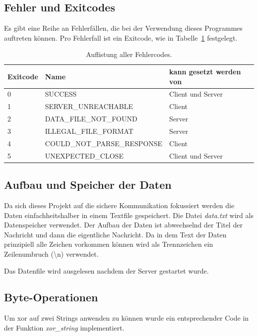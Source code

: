 \documentclass[]{article}
\begin{document}
\subsection{Fehler und Exitcodes}
Es gibt eine Reihe an Fehlerfällen, die bei der Verwendung dieses Programmes auftreten können. Pro Fehlerfall ist ein Exitcode, wie in Tabelle~\ref{tab:exit_codes} festgelegt.

\begin{table}[]
	\centering
	\begin{tabular}{|l|l|l|}
		\hline
		\textbf{Exitcode} & \textbf{Name} & \textbf{kann gesetzt werden von} \\ \hline
		0          & SUCCESS                & Client und Server     \\ \hline
		1          & SERVER\_UNREACHABLE    & Client                \\ \hline
		2          & DATA\_FILE\_NOT\_FOUND & Server                \\ \hline
		3          & ILLEGAL\_FILE\_FORMAT     & Server                \\ \hline
		4          & COULD\_NOT\_PARSE\_RESPONSE      & Client                \\ \hline
		5          & UNEXPECTED\_CLOSE      & Client und Server     \\ \hline
	\end{tabular}
	\caption{Auflistung aller Fehlercodes.}
	\label{tab:exit_codes}
\end{table}

\subsection{Aufbau und Speicher der Daten}
Da sich dieses Projekt auf die sichere Kommunikation fokussiert werden die Daten einfachheitshalber in einem Textfile gespeichert. Die Datei \textit{data.txt} wird als Datenspeicher verwendet. Der Aufbau der Daten ist abwechselnd der Titel der Nachricht und dann die eigentliche Nachricht. Da in dem Text der Daten prinzipiell alle Zeichen vorkommen können wird als Trennzeichen ein Zeilenumbruch (\textbackslash n) verwendet.

Das Datenfile wird ausgelesen nachdem der Server gestartet wurde.

\subsection{Byte-Operationen}
\label{sec:byte_operationen}
Um xor auf zwei Strings anwenden zu können wurde ein entsprechender Code in der Funktion \textit{xor\_string} implementiert.
\end{document}
